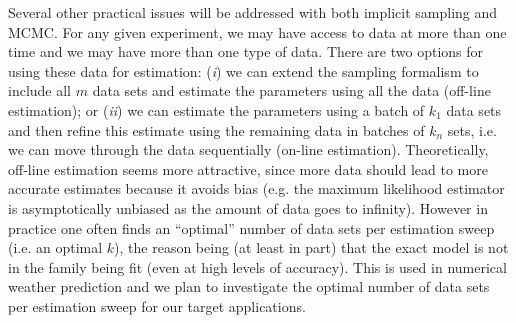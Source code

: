 \documentclass[11pt]{article}
\newcommand{\MarginPar}[1]{\marginpar{%
\vskip-\baselineskip %
\raggedright\tiny\sffamily
\hrule\smallskip{\color{red}#1}\par\smallskip\hrule}}
\begin{document}
%

Several other practical issues will be addressed with both implicit sampling and MCMC.
For any given experiment, we may have access to data at more than one time and we may have more than one type of data.
There are two options for using these data for estimation:
(\emph{i}) we can extend the
sampling formalism to include all $m$ data sets and estimate the parameters using all the data (off-line estimation); or
(\emph{ii}) we can estimate the parameters using a batch of $k_1$ data sets and then refine this estimate using
the remaining data in batches of $k_n$ sets, i.e. we can move through the data sequentially (on-line estimation).
Theoretically, off-line estimation seems more attractive, since more data should lead to more accurate estimates because it avoids bias (e.g. the maximum likelihood estimator is asymptotically unbiased as the amount of data goes to infinity).
However in practice one often finds an ``optimal'' number of data sets per estimation sweep (i.e. an optimal $k$), the reason being (at least in part) that the exact model is not in the family being fit (even at high levels of  accuracy).
This is used in numerical weather prediction and we plan to investigate the optimal number of data sets per estimation sweep for our target applications. 
\end{document}
